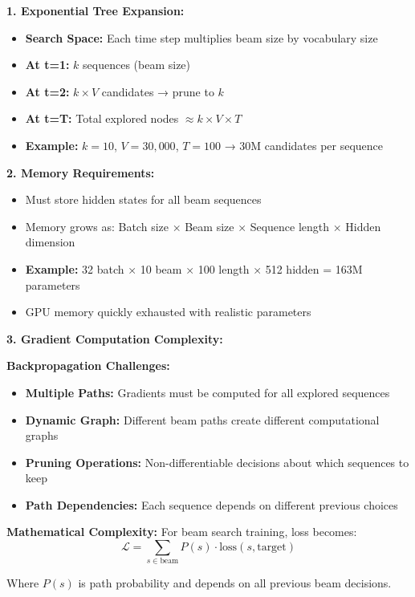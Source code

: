 \documentclass[12pt]{article}
\begin{document}
\begin{enumerate}[(a)]
{    \textbf{1. Exponential Tree Expansion:}
    \begin{itemize}
        \item \textbf{Search Space:} Each time step multiplies beam size by vocabulary size
        \item \textbf{At t=1:} $k$ sequences (beam size)
        \item \textbf{At t=2:} $k \times V$ candidates → prune to $k$
        \item \textbf{At t=T:} Total explored nodes $\approx k \times V \times T$
        \item \textbf{Example:} $k=10$, $V=30,000$, $T=100$ → 30M candidates per sequence
    \end{itemize}
    
    \textbf{2. Memory Requirements:}
    \begin{itemize}
        \item Must store hidden states for all beam sequences
        \item Memory grows as: Batch size × Beam size × Sequence length × Hidden dimension
        \item \textbf{Example:} 32 batch × 10 beam × 100 length × 512 hidden = 163M parameters
        \item GPU memory quickly exhausted with realistic parameters
    \end{itemize}
    
    \textbf{3. Gradient Computation Complexity:}
    
    \textbf{Backpropagation Challenges:}
    \begin{itemize}
        \item \textbf{Multiple Paths:} Gradients must be computed for all explored sequences
        \item \textbf{Dynamic Graph:} Different beam paths create different computational graphs
        \item \textbf{Pruning Operations:} Non-differentiable decisions about which sequences to keep
        \item \textbf{Path Dependencies:} Each sequence depends on different previous choices
    \end{itemize}
    
    \textbf{Mathematical Complexity:}
    For beam search training, loss becomes:
    $$\mathcal{L} = \sum_{s \in \text{beam}} P(s) \cdot \text{loss}(s, \text{target})$$
    
    Where $P(s)$ is path probability and depends on all previous beam decisions.
    
}
\end{enumerate}
\end{document}
